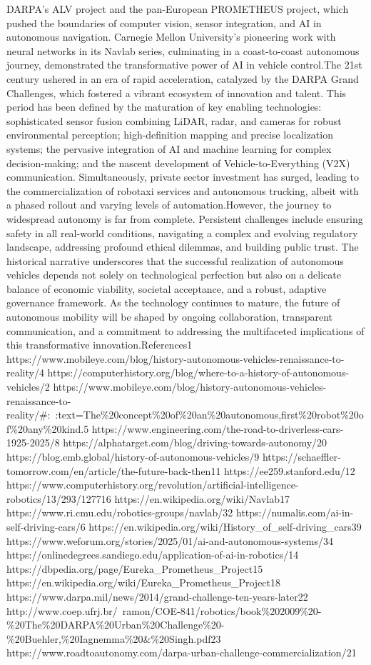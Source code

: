 DARPA's ALV project and the pan-European PROMETHEUS project, which pushed the boundaries of computer vision, sensor integration, and AI in autonomous navigation. Carnegie Mellon University's pioneering work with neural networks in its Navlab series, culminating in a coast-to-coast autonomous journey, demonstrated the transformative power of AI in vehicle control.The 21st century ushered in an era of rapid acceleration, catalyzed by the DARPA Grand Challenges, which fostered a vibrant ecosystem of innovation and talent. This period has been defined by the maturation of key enabling technologies: sophisticated sensor fusion combining LiDAR, radar, and cameras for robust environmental perception; high-definition mapping and precise localization systems; the pervasive integration of AI and machine learning for complex decision-making; and the nascent development of Vehicle-to-Everything (V2X) communication. Simultaneously, private sector investment has surged, leading to the commercialization of robotaxi services and autonomous trucking, albeit with a phased rollout and varying levels of automation.However, the journey to widespread autonomy is far from complete. Persistent challenges include ensuring safety in all real-world conditions, navigating a complex and evolving regulatory landscape, addressing profound ethical dilemmas, and building public trust. The historical narrative underscores that the successful realization of autonomous vehicles depends not solely on technological perfection but also on a delicate balance of economic viability, societal acceptance, and a robust, adaptive governance framework. As the technology continues to mature, the future of autonomous mobility will be shaped by ongoing collaboration, transparent communication, and a commitment to addressing the multifaceted implications of this transformative innovation.References1 https://www.mobileye.com/blog/history-autonomous-vehicles-renaissance-to-reality/4 https://computerhistory.org/blog/where-to-a-history-of-autonomous-vehicles/2 https://www.mobileye.com/blog/history-autonomous-vehicles-renaissance-to-reality/#:~:text=The\%20concept\%20of\%20an\%20autonomous,first\%20robot\%20of\%20any\%20kind.5 https://www.engineering.com/the-road-to-driverless-cars-1925-2025/8 https://alphatarget.com/blog/driving-towards-autonomy/20 https://blog.emb.global/history-of-autonomous-vehicles/9 https://schaeffler-tomorrow.com/en/article/the-future-back-then11 https://ee259.stanford.edu/12 https://www.computerhistory.org/revolution/artificial-intelligence-robotics/13/293/127716 https://en.wikipedia.org/wiki/Navlab17 https://www.ri.cmu.edu/robotics-groups/navlab/32 https://numalis.com/ai-in-self-driving-cars/6 https://en.wikipedia.org/wiki/History_of_self-driving_cars39 https://www.weforum.org/stories/2025/01/ai-and-autonomous-systems/34 https://onlinedegrees.sandiego.edu/application-of-ai-in-robotics/14 https://dbpedia.org/page/Eureka_Prometheus_Project15 https://en.wikipedia.org/wiki/Eureka_Prometheus_Project18 https://www.darpa.mil/news/2014/grand-challenge-ten-years-later22 http://www.coep.ufrj.br/~ramon/COE-841/robotics/book\%202009\%20-\%20The\%20DARPA\%20Urban\%20Challenge\%20-\%20Buehler,\%20Iagnemma\%20&\%20Singh.pdf23 https://www.roadtoautonomy.com/darpa-urban-challenge-commercialization/21 